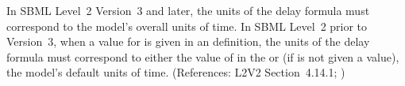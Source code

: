 In SBML Level~2 Version~3 and later, the units of the \Event delay formula
must correspond to the model's overall units of time.  In SBML Level~2
prior to Version~3, when a value for  is given in an \Event
definition, the units of the delay formula must correspond to either the
value of  in the \Event or (if  is not
given a value), the model's default units of time.  (References: L2V2
Section~4.14.1; )

